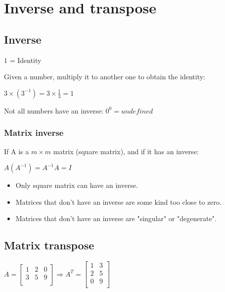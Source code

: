 \documentclass[a4paper]{report}
\begin{document}
    \section{Inverse and transpose}

      \subsection{Inverse}

        $1$ = Identity

        Given a number, multiply it to another one to obtain the identity:

        $3 \times (3^{-1}) = 3 \times \frac{1}{3} = 1$

        Not all numbers have an inverse: $0^{0} = undefined$

        \subsubsection{Matrix inverse}

          If A is a $m \times m$ matrix (square matrix), and if it has an inverse:

          $A(A^{-1}) = A^{-1}A = I$

          \begin{itemize}
            \item Only square matrix can have an inverse.
            \item Matrices that don't have an inverse are some kind too close to zero.
            \item Matrices that don't have an inverse are "singular" or "degenerate".
          \end{itemize}

      \subsection{Matrix transpose}

        $A = 
        \begin{bmatrix}
          1 & 2 & 0 \\
          3 & 5 & 9 \\
        \end{bmatrix}
        \Rightarrow
        A^{T} = 
        \begin{bmatrix}
          1 & 3 \\
          2 & 5 \\
          0 & 9 \\
        \end{bmatrix}$
\end{document}
